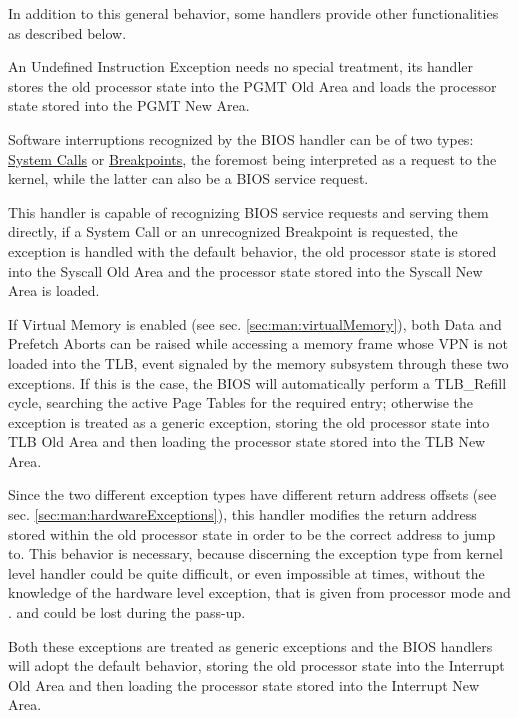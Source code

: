 In addition to this general behavior, some handlers provide other functionalities as described below.


An Undefined Instruction Exception needs no special treatment, its handler stores the old processor state into the PGMT Old Area and loads the processor state stored into the PGMT New Area.


Software interruptions recognized by the BIOS handler can be of two types: \uline{System Calls} or \uline{Breakpoints}, the foremost being interpreted as a request to the kernel, while the latter can also be a BIOS service request.

This handler is capable of recognizing BIOS service requests and serving them directly, if a System Call or an unrecognized Breakpoint is requested, the exception is handled with the default behavior, the old processor state is stored into the Syscall Old Area and the processor state stored into the Syscall New Area is loaded.


If Virtual Memory is enabled (see sec. \ref{sec:man:virtualMemory}), both Data and Prefetch Aborts can be raised while accessing a memory frame whose VPN is not loaded into the TLB, event signaled by the memory subsystem through these two exceptions.
If this is the case, the BIOS will automatically perform a TLB\_Refill cycle, searching the active Page Tables for the required entry; otherwise the exception is treated as a generic exception, storing the old processor state into TLB Old Area and then loading the processor state stored into the TLB New Area.

Since the two different exception types have different return address offsets (see sec. \ref{sec:man:hardwareExceptions}), this handler modifies the return address stored within the old processor state in order to be the correct address to jump to.
This behavior is necessary, because discerning the exception type from kernel level handler could be quite difficult, or even impossible at times, without the knowledge of the hardware level exception, that is given from processor mode and . and could be lost during the pass-up.


Both these exceptions are treated as generic exceptions and the BIOS handlers will adopt the default behavior, storing the old processor state into the Interrupt Old Area and then loading the processor state stored into the Interrupt New Area.


